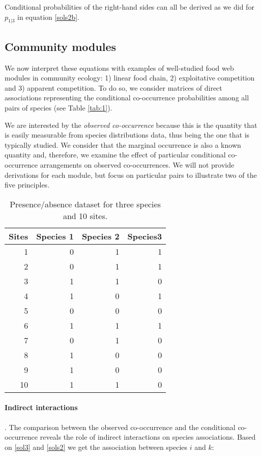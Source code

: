 Conditional probabilities of the right-hand sides can all be derived as we did for $p_{1|3}$ in equation \eqref{sols2b}.



\subsection*{Community modules}
\label{modules}

We now interpret these equations with examples of well-studied food web modules in
community ecology: 1) linear food chain, 2) exploitative competition and 3)
apparent competition. To do so, we consider matrices of direct
associations representing the conditional co-occurrence probabilities among all
pairs of species (see Table \ref{tab:1}).

We are interested by the \emph{observed co-occurrence} because this is the quantity that is easily measurable from species distributions data, thus being the one that is typically studied. We consider that the marginal occurrence is also a known quantity and, therefore, we examine the effect of particular conditional co-occurrence arrangements on observed co-occurrences. We will not provide derivations for each module, but focus on particular pairs to illustrate two of the five principles.

\begin{table}[h]
\centering
\begin{tabular}{r|r|r|r}
  Sites & Species 1 & Species 2 & Species3 \\
  \hline
1 & 0 & 1 & 1\\
2 & 0 & 1 & 1\\
3 & 1 & 1 & 0\\
4 & 1 & 0 & 1\\
5 & 0 & 0 & 0\\
6 & 1 & 1 & 1\\
7 & 0 & 1 & 0\\
8 & 1 & 0 & 0\\
9 & 1 & 0 & 0\\
10 & 1 & 1 & 0\\
  \end{tabular}
\caption{Presence/absence dataset for three species and 10 sites.}
\label{tab:2}
\end{table}

\paragraph*{Indirect interactions}. The comparison between the observed
co-occurrence and the conditional co-occurrence reveals the role of indirect
interactions on species associations. Based on \eqref{sol3} and \eqref{sols2}
we get the association between species $i$ and $k$:

